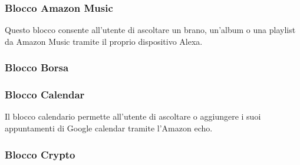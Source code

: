 \subsubsection{Blocco Amazon Music}
Questo blocco consente all'utente di ascoltare un brano, un'album o una playlist da Amazon Music tramite il proprio dispositivo Alexa.

\subsubsection{Blocco Borsa}

\subsubsection{Blocco Calendar}
Il blocco calendario permette all'utente di ascoltare o aggiungere i suoi appuntamenti di Google calendar tramite l'Amazon echo.

\subsubsection{Blocco Crypto}

